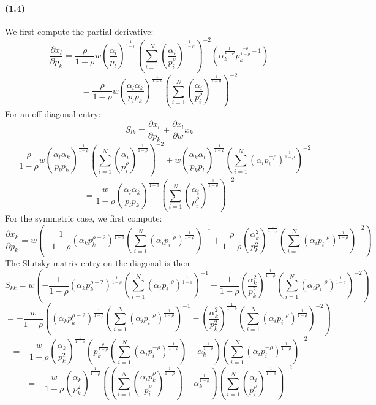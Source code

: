 \documentclass[10pt,letter]{article}
\begin{document}
\paragraph{(1.4)}
We first compute the partial derivative:
\[ \frac{\partial x_l}{\partial p_k} =  \frac{\rho}{1-\rho}w \left(\frac{\alpha_l}{p_l}\right)^{\frac{1}{1-\rho}}\left(\sum_{i=1}^N \left(\frac{\alpha_i}{p_i^\rho }\right)^{\frac{1}{1-\rho}} \right)^{-2} \left(\alpha_k^{\frac{1}{1-\rho}}p_k^{\frac{-\rho}{1-\rho} - 1} \right) \]
\[  =  \frac{\rho}{1-\rho}w \left(\frac{\alpha_l\alpha_k}{p_lp_k}\right)^{\frac{1}{1-\rho}}\left(\sum_{i=1}^N \left(\frac{\alpha_i}{p_i^\rho }\right)^{\frac{1}{1-\rho}} \right)^{-2}  \]
For an off-diagonal entry:
\[ S_{lk} = \frac{\partial x_l}{\partial p_k} + \frac{\partial x_l}{\partial w} x_k \]
\[ =  \frac{\rho}{1-\rho}w \left(\frac{\alpha_l\alpha_k}{p_lp_k}\right)^{\frac{1}{1-\rho}}\left(\sum_{i=1}^N \left(\frac{\alpha_i}{p_i^\rho }\right)^{\frac{1}{1-\rho}} \right)^{-2} + w \left(\frac{\alpha_k\alpha_l}{p_kp_l}\right)^{\frac{1}{1-\rho}}\left(\sum_{i=1}^N \left(\alpha_i p_i^{-\rho }\right)^{\frac{1}{1-\rho}} \right)^{-2} \]
\[ =  \frac{w}{1-\rho}\left(\frac{\alpha_l\alpha_k}{p_lp_k}  \right)^{\frac{1}{1-\rho}}\left(\sum_{i=1}^N \left(\frac{\alpha_i}{p_i^\rho }\right)^{\frac{1}{1-\rho}} \right)^{-2}  \]
For the symmetric case, we first compute:
\[ \frac{\partial x_k}{\partial p_k} =  w\left(  -\frac{1}{1-\rho}\left(\alpha_k p_k^{\rho-2}\right)^{\frac{1}{1-\rho}}\left(\sum_{i=1}^N \left(\alpha_i p_i^{-\rho }\right)^{\frac{1}{1-\rho}} \right)^{-1}  + \frac{\rho}{1-\rho} \left(\frac{\alpha_k^2}{p_k^2}\right)^{\frac{1}{1-\rho}}\left(\sum_{i=1}^N \left(\alpha_i p_i^{-\rho }\right)^{\frac{1}{1-\rho}} \right)^{-2} \right) \]
The Slutsky matrix entry on the diagonal is then
\[ S_{kk} = w\left(  -\frac{1}{1-\rho}\left(\alpha_k p_k^{\rho-2}\right)^{\frac{1}{1-\rho}}\left(\sum_{i=1}^N \left(\alpha_i p_i^{-\rho }\right)^{\frac{1}{1-\rho}} \right)^{-1}  + \frac{1}{1-\rho} \left(\frac{\alpha_k^2}{p_k^2}\right)^{\frac{1}{1-\rho}}\left(\sum_{i=1}^N \left(\alpha_i p_i^{-\rho }\right)^{\frac{1}{1-\rho}} \right)^{-2}  \right) \]
\[  = -\frac{w}{1-\rho}\left( \left(\alpha_k p_k^{\rho-2}\right)^{\frac{1}{1-\rho}}\left(\sum_{i=1}^N \left(\alpha_i p_i^{-\rho }\right)^{\frac{1}{1-\rho}} \right)^{-1}  - \left(\frac{\alpha_k^2}{p_k^2}\right)^{\frac{1}{1-\rho}}\left(\sum_{i=1}^N \left(\alpha_i p_i^{-\rho }\right)^{\frac{1}{1-\rho}} \right)^{-2}  \right) \]
\[  = -\frac{w}{1-\rho}\left(\frac{\alpha_k}{p_k^2} \right)^{\frac{1}{1-\rho}}\left( p_k^{\frac{\rho}{1-\rho}}\left(\sum_{i=1}^N \left(\alpha_i p_i^{-\rho }\right)^{\frac{1}{1-\rho}} \right)  - \alpha_k^{\frac{1}{1-\rho}}  \right)\left(\sum_{i=1}^N \left(\alpha_i p_i^{-\rho }\right)^{\frac{1}{1-\rho}} \right)^{-2} \]
\[  = -\frac{w}{1-\rho}\left(\frac{\alpha_k}{p_k^2} \right)^{\frac{1}{1-\rho}}\left( \left(\sum_{i=1}^N \left( \frac{\alpha_i p_k^\rho}{p_i^\rho} \right)^{\frac{1}{1-\rho}} \right)  - \alpha_k^{\frac{1}{1-\rho}}  \right)\left(\sum_{i=1}^N \left(\frac{\alpha_i}{p_i^\rho }\right)^{\frac{1}{1-\rho}} \right)^{-2} \]
\end{document}
